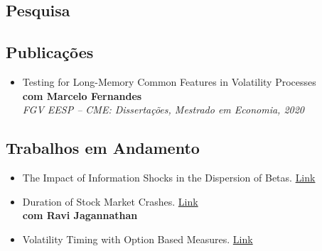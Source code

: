 \documentclass[a4paper,10pt]{article}
\begin{document}
\clearpage
\begin{samepage}
\section{Pesquisa}
\subsection{Publicações}
\begin{itemize}[label={}]
    \item Testing for Long-Memory Common Features in Volatility Processes \\
        \textbf{com Marcelo Fernandes} \\
        \textit{FGV EESP – CME: Dissertações, Mestrado em Economia, 2020}
\end{itemize}
\subsection{Trabalhos em Andamento}
\begin{itemize}
    \item The Impact of Information Shocks in the Dispersion of Betas. \href{https://joseparreiras.github.io/projects/news-and-betas}{Link}
    \item Duration of Stock Market Crashes. \href{https://joseparreiras.github.io/projects/news-and-betas}{Link} \\
        \textbf{com Ravi Jagannathan}
    \item Volatility Timing with Option Based Measures. \href{https://joseparreiras.github.io/projects/news-and-betas}{Link}
\end{itemize}



\end{samepage}
\end{document}
